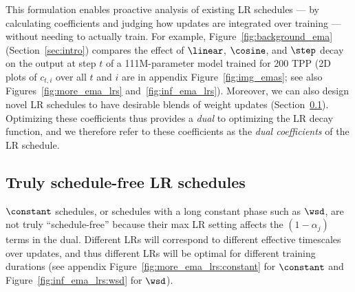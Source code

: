 This formulation enables proactive analysis of existing LR schedules
--- by calculating coefficients and judging how updates are integrated
over training --- without needing to actually train.  For example,
Figure~\ref{fig:background_ema} (Section~\ref{sec:intro}) compares the
effect of $\linear$, $\cosine$, and $\step$ decay on the output at
step $t$ of a 111M-parameter model trained for 200 TPP (2D plots of
$c_{t,i}$ over all $t$ and $i$ are in appendix
Figure~\ref{fig:img_emas}; see also Figures~\ref{fig:more_ema_lrs}
and~\ref{fig:inf_ema_lrs}).
%
Moreover, we can also design novel LR schedules to have desirable
blends of weight updates (Section~\ref{subsec:rational}).  Optimizing
these coefficients thus provides a \emph{dual} to optimizing the LR
decay function, and we therefore refer to these coefficients as the
\emph{dual coefficients} of the LR schedule.


\subsection{Truly schedule-free LR schedules}\label{subsec:rational}

$\constant$ schedules, or schedules with a long constant phase such as
$\wsd$, are not truly ``schedule-free'' because their max LR setting
affects the $(1 - \alpha_j)$ terms in the dual.  Different LRs will
correspond to different effective timescales over updates, and thus
different LRs will be optimal for different training durations (see
appendix Figure~\ref{fig:more_ema_lrs:constant} for $\constant$ and
Figure~\ref{fig:inf_ema_lrs:wsd} for $\wsd$).

